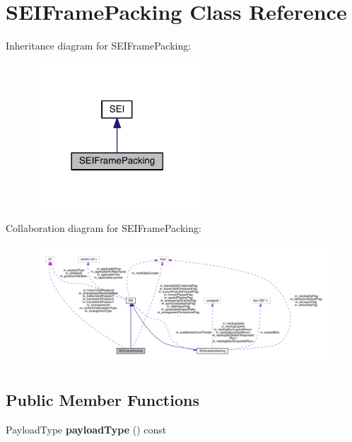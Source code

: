 \hypertarget{class_s_e_i_frame_packing}{}\section{S\+E\+I\+Frame\+Packing Class Reference}
\label{class_s_e_i_frame_packing}


Inheritance diagram for S\+E\+I\+Frame\+Packing\+:
\nopagebreak
\begin{figure}[H]
\begin{center}
\leavevmode
\includegraphics[width=177pt]{d9/dd5/class_s_e_i_frame_packing__inherit__graph}
\end{center}
\end{figure}


Collaboration diagram for S\+E\+I\+Frame\+Packing\+:
\nopagebreak
\begin{figure}[H]
\begin{center}
\leavevmode
\includegraphics[width=350pt]{dd/d42/class_s_e_i_frame_packing__coll__graph}
\end{center}
\end{figure}
\subsection*{Public Member Functions}
\begin{DoxyCompactItemize}
\item 
\mbox{\label{class_s_e_i_frame_packing_a5d1b84959880ac0416260abb4883e3c0}} 
Payload\+Type {\bfseries payload\+Type} () const
\end{DoxyCompactItemize}
